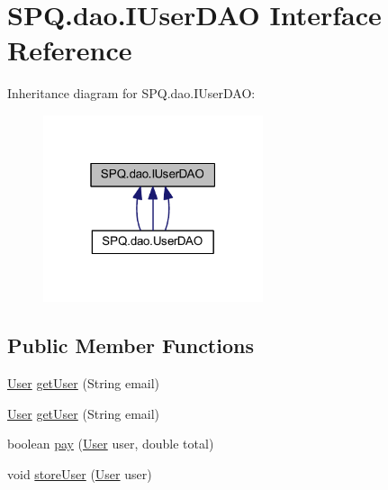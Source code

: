 \hypertarget{interface_s_p_q_1_1dao_1_1_i_user_d_a_o}{}\section{S\+P\+Q.\+dao.\+I\+User\+D\+AO Interface Reference}
\label{interface_s_p_q_1_1dao_1_1_i_user_d_a_o}


Inheritance diagram for S\+P\+Q.\+dao.\+I\+User\+D\+AO\+:\nopagebreak
\begin{figure}[H]
\begin{center}
\leavevmode
\includegraphics[width=183pt]{interface_s_p_q_1_1dao_1_1_i_user_d_a_o__inherit__graph}
\end{center}
\end{figure}
\subsection*{Public Member Functions}
\begin{DoxyCompactItemize}
\item 
\mbox{\hyperlink{class_s_p_q_1_1data_1_1_user}{User}} \mbox{\hyperlink{interface_s_p_q_1_1dao_1_1_i_user_d_a_o_ac53b137d5e0828058457e59fa70c2b95}{get\+User}} (String email)
\item 
\mbox{\hyperlink{class_s_p_q_1_1data_1_1_user}{User}} \mbox{\hyperlink{interface_s_p_q_1_1dao_1_1_i_user_d_a_o_ac53b137d5e0828058457e59fa70c2b95}{get\+User}} (String email)
\item 
boolean \mbox{\hyperlink{interface_s_p_q_1_1dao_1_1_i_user_d_a_o_a8a4257a186a80d5842e26aeb1140a402}{pay}} (\mbox{\hyperlink{class_s_p_q_1_1data_1_1_user}{User}} user, double total)
\item 
void \mbox{\hyperlink{interface_s_p_q_1_1dao_1_1_i_user_d_a_o_a286f084c9e920d1ce196658ab63ab0af}{store\+User}} (\mbox{\hyperlink{class_s_p_q_1_1data_1_1_user}{User}} user)
\end{DoxyCompactItemize}


